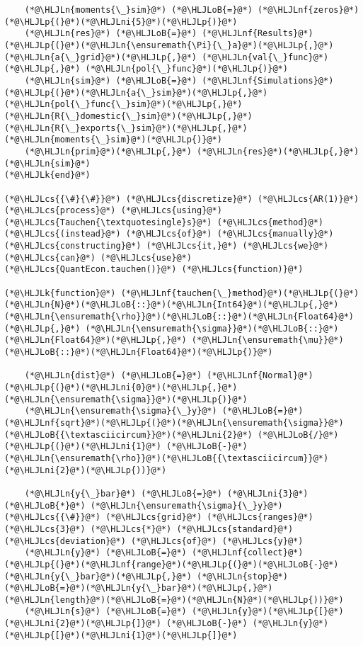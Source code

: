 \documentclass[12pt,a4paper]{article}
\newcommand{\HLJLk}[1]{\textcolor[RGB]{148,91,176}{\textbf{#1}}}
\newcommand{\HLJLn}[1]{#1}
\newcommand{\HLJLnf}[1]{\textcolor[RGB]{66,102,213}{#1}}
\newcommand{\HLJLni}[1]{\textcolor[RGB]{59,151,46}{#1}}
\newcommand{\HLJLoB}[1]{\textcolor[RGB]{102,102,102}{\textbf{#1}}}
\newcommand{\HLJLp}[1]{#1}
\newcommand{\HLJLcs}[1]{\textcolor[RGB]{153,153,119}{\textit{#1}}}
\begin{document}
\begin{lstlisting}
    (*@\HLJLn{moments{\_}sim}@*) (*@\HLJLoB{=}@*) (*@\HLJLnf{zeros}@*)(*@\HLJLp{(}@*)(*@\HLJLni{5}@*)(*@\HLJLp{)}@*)
    (*@\HLJLn{res}@*) (*@\HLJLoB{=}@*) (*@\HLJLnf{Results}@*)(*@\HLJLp{(}@*)(*@\HLJLn{\ensuremath{\Pi}{\_}a}@*)(*@\HLJLp{,}@*) (*@\HLJLn{a{\_}grid}@*)(*@\HLJLp{,}@*) (*@\HLJLn{val{\_}func}@*)(*@\HLJLp{,}@*) (*@\HLJLn{pol{\_}func}@*)(*@\HLJLp{)}@*)
    (*@\HLJLn{sim}@*) (*@\HLJLoB{=}@*) (*@\HLJLnf{Simulations}@*)(*@\HLJLp{(}@*)(*@\HLJLn{a{\_}sim}@*)(*@\HLJLp{,}@*) (*@\HLJLn{pol{\_}func{\_}sim}@*)(*@\HLJLp{,}@*) (*@\HLJLn{R{\_}domestic{\_}sim}@*)(*@\HLJLp{,}@*) (*@\HLJLn{R{\_}exports{\_}sim}@*)(*@\HLJLp{,}@*) (*@\HLJLn{moments{\_}sim}@*)(*@\HLJLp{)}@*)
    (*@\HLJLn{prim}@*)(*@\HLJLp{,}@*) (*@\HLJLn{res}@*)(*@\HLJLp{,}@*) (*@\HLJLn{sim}@*)
(*@\HLJLk{end}@*)

(*@\HLJLcs{{\#}{\#}}@*) (*@\HLJLcs{discretize}@*) (*@\HLJLcs{AR(1)}@*) (*@\HLJLcs{process}@*) (*@\HLJLcs{using}@*) (*@\HLJLcs{Tauchen{\textquotesingle}s}@*) (*@\HLJLcs{method}@*) (*@\HLJLcs{(instead}@*) (*@\HLJLcs{of}@*) (*@\HLJLcs{manually}@*) (*@\HLJLcs{constructing}@*) (*@\HLJLcs{it,}@*) (*@\HLJLcs{we}@*) (*@\HLJLcs{can}@*) (*@\HLJLcs{use}@*) (*@\HLJLcs{QuantEcon.tauchen()}@*) (*@\HLJLcs{function)}@*)

(*@\HLJLk{function}@*) (*@\HLJLnf{tauchen{\_}method}@*)(*@\HLJLp{(}@*)(*@\HLJLn{N}@*)(*@\HLJLoB{::}@*)(*@\HLJLn{Int64}@*)(*@\HLJLp{,}@*) (*@\HLJLn{\ensuremath{\rho}}@*)(*@\HLJLoB{::}@*)(*@\HLJLn{Float64}@*)(*@\HLJLp{,}@*) (*@\HLJLn{\ensuremath{\sigma}}@*)(*@\HLJLoB{::}@*)(*@\HLJLn{Float64}@*)(*@\HLJLp{,}@*) (*@\HLJLn{\ensuremath{\mu}}@*)(*@\HLJLoB{::}@*)(*@\HLJLn{Float64}@*)(*@\HLJLp{)}@*)

    (*@\HLJLn{dist}@*) (*@\HLJLoB{=}@*) (*@\HLJLnf{Normal}@*)(*@\HLJLp{(}@*)(*@\HLJLni{0}@*)(*@\HLJLp{,}@*) (*@\HLJLn{\ensuremath{\sigma}}@*)(*@\HLJLp{)}@*)
    (*@\HLJLn{\ensuremath{\sigma}{\_}y}@*) (*@\HLJLoB{=}@*) (*@\HLJLnf{sqrt}@*)(*@\HLJLp{(}@*)(*@\HLJLn{\ensuremath{\sigma}}@*)(*@\HLJLoB{{\textasciicircum}}@*)(*@\HLJLni{2}@*) (*@\HLJLoB{/}@*) (*@\HLJLp{(}@*)(*@\HLJLni{1}@*) (*@\HLJLoB{-}@*) (*@\HLJLn{\ensuremath{\rho}}@*)(*@\HLJLoB{{\textasciicircum}}@*)(*@\HLJLni{2}@*)(*@\HLJLp{))}@*)

    (*@\HLJLn{y{\_}bar}@*) (*@\HLJLoB{=}@*) (*@\HLJLni{3}@*) (*@\HLJLoB{*}@*) (*@\HLJLn{\ensuremath{\sigma}{\_}y}@*) (*@\HLJLcs{{\#}}@*) (*@\HLJLcs{grid}@*) (*@\HLJLcs{ranges}@*) (*@\HLJLcs{3}@*) (*@\HLJLcs{*}@*) (*@\HLJLcs{standard}@*) (*@\HLJLcs{deviation}@*) (*@\HLJLcs{of}@*) (*@\HLJLcs{y}@*)
    (*@\HLJLn{y}@*) (*@\HLJLoB{=}@*) (*@\HLJLnf{collect}@*)(*@\HLJLp{(}@*)(*@\HLJLnf{range}@*)(*@\HLJLp{(}@*)(*@\HLJLoB{-}@*)(*@\HLJLn{y{\_}bar}@*)(*@\HLJLp{,}@*) (*@\HLJLn{stop}@*)(*@\HLJLoB{=}@*)(*@\HLJLn{y{\_}bar}@*)(*@\HLJLp{,}@*) (*@\HLJLn{length}@*)(*@\HLJLoB{=}@*)(*@\HLJLn{N}@*)(*@\HLJLp{))}@*)
    (*@\HLJLn{s}@*) (*@\HLJLoB{=}@*) (*@\HLJLn{y}@*)(*@\HLJLp{[}@*)(*@\HLJLni{2}@*)(*@\HLJLp{]}@*) (*@\HLJLoB{-}@*) (*@\HLJLn{y}@*)(*@\HLJLp{[}@*)(*@\HLJLni{1}@*)(*@\HLJLp{]}@*)


\end{lstlisting}
\end{document}

